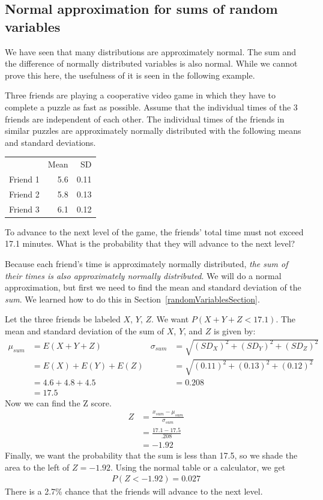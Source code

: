 \subsection{Normal approximation for sums of random variables}
\label{normapproxsumrv}

We have seen that many distributions are approximately normal. The sum and the difference of normally distributed variables is also normal. While we cannot prove this here, the usefulness of it is seen in the following example.

\begin{example}{Three friends are playing a cooperative video game in which they have to complete a puzzle as fast as possible. Assume that the individual times of the 3 friends are independent of each other. The individual times of the friends in similar puzzles are approximately normally distributed with the following means and standard deviations. 
\begin{center}
\begin{tabular}{lrr}
& Mean &  SD \\
Friend 1 	& 5.6 & 0.11  \\
Friend 2 	& 5.8  & 0.13 \\
Friend 3 	& 6.1  & 0.12  
\end{tabular}
\end{center}
To advance to the next level of the game, the friends' total time must not exceed 17.1 minutes. What is the probability that they will advance to the next level?}
Because each friend's time is approximately normally distributed, \emph{the sum of their times is also approximately normally distributed}. We will do a normal approximation, but first we need to find the mean and standard deviation of the \emph{sum}. We learned how to do this in Section~\ref{randomVariablesSection}.

Let the three friends be labeled $X$, $Y$, $Z$. We want $P(X + Y + Z < 17.1)$. The mean and standard deviation of the sum of $X$, $Y$, and $Z$ is given by:
\begin{align*}
\mu_{sum} &= E(X+Y+Z)
	& \sigma_{sum}&= \sqrt{(SD_X)^2+(SD_Y)^2 + (SD_Z)^2} \\
&= E(X) + E(Y) + E(Z)
	& &= \sqrt{(0.11)^2+(0.13)^2+(0.12)^2}\\
&=4.6+4.8+4.5
	& &= 0.208 \\
&=17.5
\end{align*}
Now we can find the Z score. 
\begin{align*}
Z &= \frac{x_{sum}-\mu_{sum}}{\sigma_{sum}} \\
&=\frac{17.1-17.5}{.208} \\
&=-1.92
\end{align*}
Finally, we want the probability that the sum is less than 17.5, so we shade the area to the left of $Z = -1.92$. Using the normal table or a calculator, we get
\begin{align*}
P(Z < -1.92) = 0.027
\end{align*}
There is a 2.7\% chance that the friends will advance to the next level.
\end{example}

